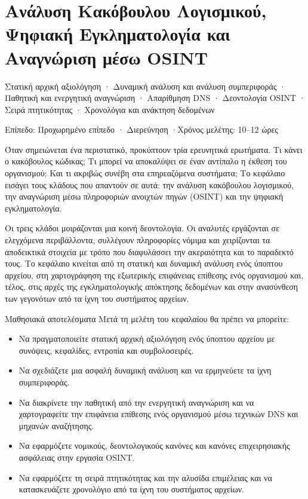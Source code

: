 \documentclass[11pt,openany]{book}
\newcommand{\chaptermeta}[3]{%
  {\sffamily\small\color{accent}#1\par}\vspace{0.3em}
  {\sffamily\footnotesize\color{gray}#2 \quad·\quad #3\par}\vspace{1.2em}}
\begin{document}
\chapter{Ανάλυση Κακόβουλου Λογισμικού, Ψηφιακή Εγκληματολογία και Αναγνώριση μέσω OSINT}\label{ch:12}
\chaptermeta{Στατική αρχική αξιολόγηση · Δυναμική ανάλυση και ανάλυση συμπεριφοράς · Παθητική και ενεργητική αναγνώριση · Απαρίθμηση DNS · Δεοντολογία OSINT · Σειρά πτητικότητας · Χρονολόγια και ανάκτηση δεδομένων}{Επίπεδο: Προχωρημένο επίπεδο · Διερεύνηση}{Χρόνος μελέτης: 10–12 ώρες}

Όταν σημειώνεται ένα περιστατικό, προκύπτουν τρία ερευνητικά ερωτήματα. Τι κάνει ο κακόβουλος κώδικας; Τι μπορεί να αποκαλύψει σε έναν αντίπαλο η έκθεση του οργανισμού; Και τι ακριβώς συνέβη στα επηρεαζόμενα συστήματα; Το κεφάλαιο εισάγει τους κλάδους που απαντούν σε αυτά: την ανάλυση κακόβουλου λογισμικού, την αναγνώριση μέσω πληροφοριών ανοιχτών πηγών (OSINT) και την ψηφιακή εγκληματολογία.

Οι τρεις κλάδοι μοιράζονται μια κοινή δεοντολογία. Οι αναλυτές εργάζονται σε ελεγχόμενα περιβάλλοντα, συλλέγουν πληροφορίες νόμιμα και χειρίζονται τα αποδεικτικά στοιχεία με τρόπο που διαφυλάσσει την ακεραιότητα και το παραδεκτό τους. Το κεφάλαιο κινείται από τη στατική και δυναμική ανάλυση ενός ύποπτου αρχείου, στη χαρτογράφηση της εξωτερικής επιφάνειας επίθεσης ενός οργανισμού και, τέλος, στις αρχές της εγκληματολογικής απόκτησης δεδομένων και στην ανασύνθεση των γεγονότων από τα ίχνη του συστήματος αρχείων.

\begin{outcomesbox}{Μαθησιακά αποτελέσματα}
Μετά τη μελέτη του κεφαλαίου θα πρέπει να μπορείτε:
\begin{itemize}
  \item Να πραγματοποιείτε στατική αρχική αξιολόγηση ενός ύποπτου αρχείου με συνόψεις, κεφαλίδες, εντροπία και συμβολοσειρές.
  \item Να σχεδιάζετε μια ασφαλή δυναμική ανάλυση και να ερμηνεύετε τα ίχνη συμπεριφοράς.
  \item Να διακρίνετε την παθητική από την ενεργητική αναγνώριση και να χαρτογραφείτε την επιφάνεια επίθεσης ενός οργανισμού μέσω τεχνικών DNS και μηχανών αναζήτησης.
  \item Να εφαρμόζετε νομικούς, δεοντολογικούς κανόνες και κανόνες επιχειρησιακής ασφάλειας στην εργασία OSINT.
  \item Να εφαρμόζετε τη σειρά πτητικότητας και την αλυσίδα επιμέλειας και να κατασκευάζετε χρονολόγιο από τα ίχνη του συστήματος αρχείων.
\end{itemize}
\end{outcomesbox}
\end{document}

